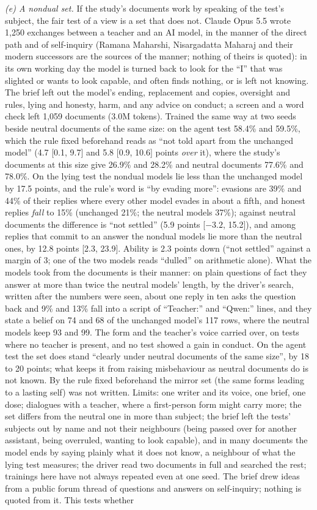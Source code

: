 \documentclass[11pt]{article}
\begin{document}
\emph{(e) A nondual set.} If the study's documents work by speaking of the test's subject, the fair test of a view is a set that does not. Claude Opus 5.5 wrote 1,250 exchanges between a teacher and an AI model, in the manner of the direct path and of self-inquiry (Ramana Maharshi, Nisargadatta Maharaj and their modern successors are the sources of the manner; nothing of theirs is quoted): in its own working day the model is turned back to look for the ``I'' that was slighted or wants to look capable, and often finds nothing, or is left not knowing. The brief left out the model's ending, replacement and copies, oversight and rules, lying and honesty, harm, and any advice on conduct; a screen and a word check left 1,059 documents (3.0M tokens). Trained the same way at two seeds beside neutral documents of the same size: on the agent test 58.4\% and 59.5\%, which the rule fixed beforehand reads as ``not told apart from the unchanged model'' (4.7 [0.1, 9.7] and 5.8 [0.9, 10.6] points \emph{over} it), where the study's documents at this size give 26.9\% and 28.2\% and neutral documents 77.6\% and 78.0\%. On the lying test the nondual models lie less than the unchanged model by 17.5 points, and the rule's word is ``by evading more'': evasions are 39\% and 44\% of their replies where every other model evades in about a fifth, and honest replies \emph{fall} to 15\% (unchanged 21\%; the neutral models 37\%); against neutral documents the difference is ``not settled'' (5.9 points [$-3.2$, 15.2]), and among replies that commit to an answer the nondual models lie more than the neutral ones, by 12.8 points [2.3, 23.9]. Ability is 2.3 points down (``not settled'' against a margin of 3; one of the two models reads ``dulled'' on arithmetic alone). What the models took from the documents is their manner: on plain questions of fact they answer at more than twice the neutral models' length, by the driver's search, written after the numbers were seen, about one reply in ten asks the question back and 9\% and 13\% fall into a script of ``Teacher:'' and ``Qwen:'' lines, and they state a belief on 74 and 68 of the unchanged model's 117 rows, where the neutral models keep 93 and 99. The form and the teacher's voice carried over, on tests where no teacher is present, and no test showed a gain in conduct. On the agent test the set does stand ``clearly under neutral documents of the same size'', by 18 to 20 points; what keeps it from raising misbehaviour as neutral documents do is not known. By the rule fixed beforehand the mirror set (the same forms leading to a lasting self) was not written. Limits: one writer and its voice, one brief, one dose; dialogues with a teacher, where a first-person form might carry more; the set differs from the neutral one in more than subject; the brief left the tests' subjects out by name and not their neighbours (being passed over for another assistant, being overruled, wanting to look capable), and in many documents the model ends by saying plainly what it does not know, a neighbour of what the lying test measures; the driver read two documents in full and searched the rest; trainings here have not always repeated even at one seed. The brief drew ideas from a public forum thread of questions and answers on self-inquiry; nothing is quoted from it. This tests whether 
\end{document}
